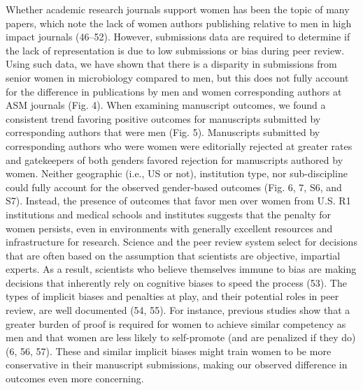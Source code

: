 \documentclass[11pt,]{article}
\begin{document}
Whether academic research journals support women has been the topic of
many papers, which note the lack of women authors publishing relative to
men in high impact journals (46--52). However, submissions data are
required to determine if the lack of representation is due to low
submissions or bias during peer review. Using such data, we have shown
that there is a disparity in submissions from senior women in
microbiology compared to men, but this does not fully account for the
difference in publications by men and women corresponding authors at ASM
journals (Fig. 4). When examining manuscript outcomes, we found a
consistent trend favoring positive outcomes for manuscripts submitted by
corresponding authors that were men (Fig. 5). Manuscripts submitted by
corresponding authors who were women were editorially rejected at
greater rates and gatekeepers of both genders favored rejection for
manuscripts authored by women. Neither geographic (i.e., US or not),
institution type, nor sub-discipline could fully account for the
observed gender-based outcomes (Fig. 6, 7, S6, and S7). Instead, the
presence of outcomes that favor men over women from U.S. R1 institutions
and medical schools and institutes suggests that the penalty for women
persists, even in environments with generally excellent resources and
infrastructure for research. Science and the peer review system select
for decisions that are often based on the assumption that scientists are
objective, impartial experts. As a result, scientists who believe
themselves immune to bias are making decisions that inherently rely on
cognitive biases to speed the process (53). The types of implicit biases
and penalties at play, and their potential roles in peer review, are
well documented (54, 55). For instance, previous studies show that a
greater burden of proof is required for women to achieve similar
competency as men and that women are less likely to self-promote (and
are penalized if they do) (6, 56, 57). These and similar implicit biases
might train women to be more conservative in their manuscript
submissions, making our observed difference in outcomes even more
concerning.
\end{document}
